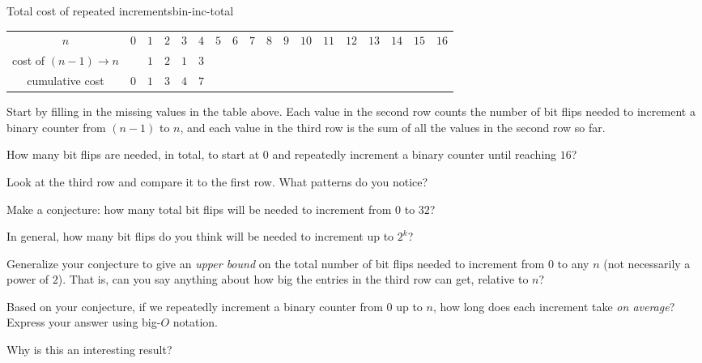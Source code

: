 \documentclass{tufte-handout}
\begin{document}
\begin{model*}{Total cost of repeated increments}{bin-inc-total}
  \centering
  \begin{tabular}{c|ccccccccccccccccc}
    $n$ & $0$ & $1$ & $2$ & $3$ & $4$ & $5$ & $6$ & $7$ & $8$ & $9$ & $10$
    & $11$ & $12$ & $13$ & $14$ & $15$ & $16$ \\[8pt]
    cost of $(n-1) \to n$ &  & $1$ & $2$ & $1$ & $3$ & &  &  &  &  &
    &  &  &  &  &  &  \\[8pt]
    cumulative cost & $0$ & $1$ & $3$ & $4$ & $7$ &  &  &  &
    &  &  &  &  &  &  &  &
  \end{tabular}
\end{model*}

\begin{questions}
\item Start by filling in the missing values in the table above. Each
  value in the second row counts the number of bit flips needed to
  increment a binary counter from $(n-1)$ to $n$, and each value in
  the third row is the sum of all the values in the second row so far.
  \item How many bit flips are needed, in total, to start at $0$ and
    repeatedly increment a binary counter until reaching $16$?
  \item Look at the third row and compare it to the first row.  What
    patterns do you notice? 
  \item Make a conjecture: how many total bit flips will be needed to
    increment from $0$ to $32$?
  \item In general, how many bit flips do you think will be needed to
    increment up to $2^k$?
  \item \label{q:upper-bound} Generalize your conjecture to give an
    \emph{upper bound} on the total number of bit flips needed to
    increment from $0$ to any $n$ (not necessarily a power of $2$).
    That is, can you say anything about how big the entries in the
    third row can get, relative to $n$?
  \item Based on your conjecture, if we repeatedly increment a binary
    counter from $0$ up to $n$, how long does each increment take
    \emph{on average}?  Express your answer using big-$O$ notation.
  \item Why is this an interesting result?
\end{questions}
\end{document}
